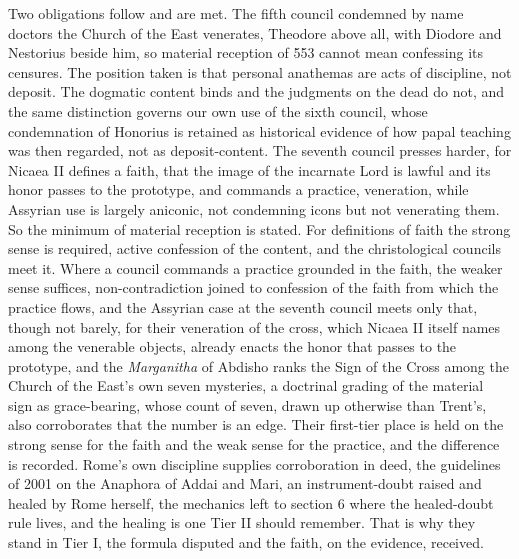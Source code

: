 \documentclass[11pt,twoside]{article}
\begin{document}
Two obligations follow and are met. The fifth council condemned by name doctors the Church of the East venerates, Theodore above all, with Diodore and Nestorius beside him, so material reception of 553 cannot mean confessing its censures. The position taken is that personal anathemas are acts of discipline, not deposit. The dogmatic content binds and the judgments on the dead do not, and the same distinction governs our own use of the sixth council, whose condemnation of Honorius is retained as historical evidence of how papal teaching was then regarded, not as deposit-content. The seventh council presses harder, for Nicaea II defines a faith, that the image of the incarnate Lord is lawful and its honor passes to the prototype, and commands a practice, veneration, while Assyrian use is largely aniconic, not condemning icons but not venerating them. So the minimum of material reception is stated. For definitions of faith the strong sense is required, active confession of the content, and the christological councils meet it. Where a council commands a practice grounded in the faith, the weaker sense suffices, non-contradiction joined to confession of the faith from which the practice flows, and the Assyrian case at the seventh council meets only that, though not barely, for their veneration of the cross, which Nicaea II itself names among the venerable objects, already enacts the honor that passes to the prototype, and the \emph{Marganitha} of Abdisho ranks the Sign of the Cross among the Church of the East's own seven mysteries, a doctrinal grading of the material sign as grace-bearing, whose count of seven, drawn up otherwise than Trent's, also corroborates that the number is an edge. Their first-tier place is held on the strong sense for the faith and the weak sense for the practice, and the difference is recorded. Rome's own discipline supplies corroboration in deed, the guidelines of 2001 on the Anaphora of Addai and Mari, an instrument-doubt raised and healed by Rome herself, the mechanics left to section 6 where the healed-doubt rule lives, and the healing is one Tier II should remember. That is why they stand in Tier I, the formula disputed and the faith, on the evidence, received.
\end{document}
